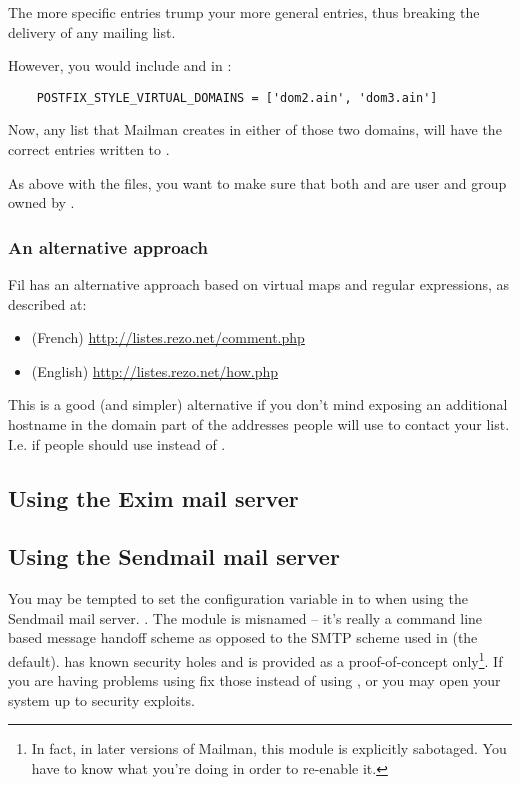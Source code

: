 \documentclass{howto}
\begin{document}
The more specific entries trump your more general entries, thus breaking the
delivery of any  mailing list.

However, you would include  and  in
:

\begin{verbatim}
    POSTFIX_STYLE_VIRTUAL_DOMAINS = ['dom2.ain', 'dom3.ain']
\end{verbatim}

Now, any list that Mailman creates in either of those two domains, will have
the correct entries written to .

As above with the  files, you want to make sure that both
 and  are user and
group owned by .

\subsubsection{An alternative approach}

Fil  has an alternative approach based on virtual maps and
regular expressions, as described at:

\begin{itemize}
\item (French)  \url{http://listes.rezo.net/comment.php}
\item (English) \url{http://listes.rezo.net/how.php}
\end{itemize}

This is a good (and simpler) alternative if you don't mind exposing an
additional hostname in the domain part of the addresses people will use to
contact your list.  I.e. if people should use 
instead of .

\subsection{Using the Exim mail server}

\subsection{Using the Sendmail mail server}

\begin{notice}[warning]
You may be tempted to set the  configuration variable in
 to  when using the Sendmail mail server.
.  The  module is misnamed -- it's really a
command line based message handoff scheme as opposed to the SMTP scheme used
in  (the default).   has known security
holes and is provided as a proof-of-concept only\footnote{In fact, in later
versions of Mailman, this module is explicitly sabotaged.  You have to know
what you're doing in order to re-enable it.}.  If you are having problems
using  fix those instead of using , or
you may open your system up to security exploits.
\end{notice}
\end{document}
